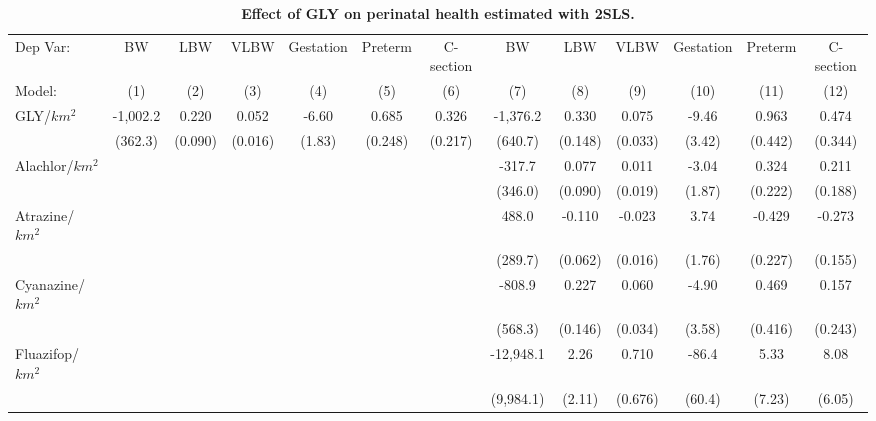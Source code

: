 \begin{table}[htbp]
   \caption{\label{tab:main-outcomes-controls} \textbf{Effect of GLY on perinatal health estimated with 2SLS.}}
   \centering
   \begin{tabular}{lcccccccccccc}
      \toprule
      Dep Var:                  & BW       & LBW     & VLBW    & Gestation & Preterm & C-section & BW         & LBW     & VLBW    & Gestation & Preterm & C-section\\  
      Model:                    & (1)      & (2)     & (3)     & (4)       & (5)     & (6)       & (7)        & (8)     & (9)     & (10)      & (11)    & (12)\\  
      \midrule 
      GLY/$km^2$                & -1,002.2 & 0.220   & 0.052   & -6.60     & 0.685   & 0.326     & -1,376.2   & 0.330   & 0.075   & -9.46     & 0.963   & 0.474\\   
                                & (362.3)  & (0.090) & (0.016) & (1.83)    & (0.248) & (0.217)   & (640.7)    & (0.148) & (0.033) & (3.42)    & (0.442) & (0.344)\\   
      Alachlor/$km^2$           &          &         &         &           &         &           & -317.7     & 0.077   & 0.011   & -3.04     & 0.324   & 0.211\\   
                                &          &         &         &           &         &           & (346.0)    & (0.090) & (0.019) & (1.87)    & (0.222) & (0.188)\\   
      Atrazine/$km^2$           &          &         &         &           &         &           & 488.0      & -0.110  & -0.023  & 3.74      & -0.429  & -0.273\\   
                                &          &         &         &           &         &           & (289.7)    & (0.062) & (0.016) & (1.76)    & (0.227) & (0.155)\\   
      Cyanazine/$km^2$          &          &         &         &           &         &           & -808.9     & 0.227   & 0.060   & -4.90     & 0.469   & 0.157\\   
                                &          &         &         &           &         &           & (568.3)    & (0.146) & (0.034) & (3.58)    & (0.416) & (0.243)\\   
      Fluazifop/$km^2$          &          &         &         &           &         &           & -12,948.1  & 2.26    & 0.710   & -86.4     & 5.33    & 8.08\\   
                                &          &         &         &           &         &           & (9,984.1)  & (2.11)  & (0.676) & (60.4)    & (7.23)  & (6.05)\\   

\end{tabular}
\end{table}
